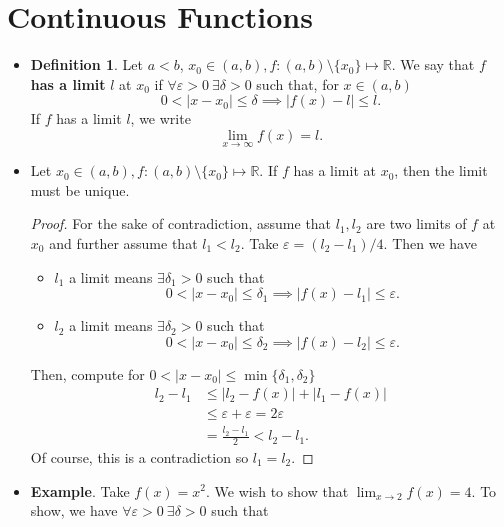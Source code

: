 \documentclass{article}
\newcommand{\R}{\mathbb{R}}
\newcommand{\?}{\stackrel{?}{=}}
\newcommand{\smallblacksquare}{\rule{0.5em}{0.5em}}
\theoremstyle{definition} %
\newtheorem{definition}[subsection]{Definition} %
\begin{document}
\section{Continuous Functions}

\begin{itemize}
    \item[]
    \begin{definition}
        Let $a < b$, $x_0 \in (a, b), f:(a, b) \setminus \{x_0\} \mapsto \R$. We say that $f$ \textbf{has a limit} $l$ at $x_0$ if $\forall \varepsilon > 0 \ \exists \delta > 0$ such that, for $x \in (a, b)$
        $$0 < |x - x_0| \leq \delta \implies |f(x) - l| \leq l.$$
        If $f$ has a limit $l$, we write
        $$\lim_{x \to \infty} f(x) = l.$$
    \end{definition}
    \item[]
    \begin{proposition}
        Let $x_0 \in (a, b), f: (a, b) \setminus \{x_0\} \mapsto \R$. If $f$ has a limit at $x_0$, then the limit must be unique.    
    \end{proposition}
    \begin{proof}
        For the sake of contradiction, assume that $l_1, l_2$ are two limits of $f$ at $x_0$ and further assume that $l_1 < l_2$. Take $\varepsilon = (l_2 - l_1) / 4$. Then we have
        \begin{itemize}[label=\smallblacksquare]
            \item $l_1$ a limit means $\exists \delta_1 > 0$ such that
            $$0 < |x - x_0| \leq \delta_1 \implies |f(x) - l_1| \leq \varepsilon.$$
            \item $l_2$ a limit means $\exists \delta_2 > 0$ such that
            $$0 < |x - x_0| \leq \delta_2 \implies |f(x) - l_2| \leq \varepsilon.$$
        \end{itemize}
        Then, compute for $0 < |x - x_0| \leq \min\{\delta_1, \delta_2\}$
        \begin{align*}
            l_2 - l_1 &\leq |l_2 - f(x)| + |l_1 - f(x)| \\ 
            &\leq \varepsilon + \varepsilon = 2\varepsilon \\
            &= \frac{l_2 - l_1}{2} < l_2 - l_1.
        \end{align*}
        Of course, this is a contradiction so $l_1 = l_2$.
    \end{proof}
    \item \textbf{Example}. Take $f(x) = x^2$. We wish to show that $\lim_{x \to 2} f(x) = 4$. To show, we have $\forall \varepsilon > 0 \ \exists \delta > 0$ such that 

\end{itemize}
\end{document}
